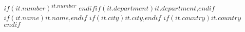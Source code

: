 $if(it.number)$\textsuperscript{$it.number$} $endif$$if(it.department)$$it.department$,$endif$ $if(it.name)$$it.name$,$endif$ $if(it.city)$$it.city$,$endif$ $if(it.country)$$it.country$$endif$